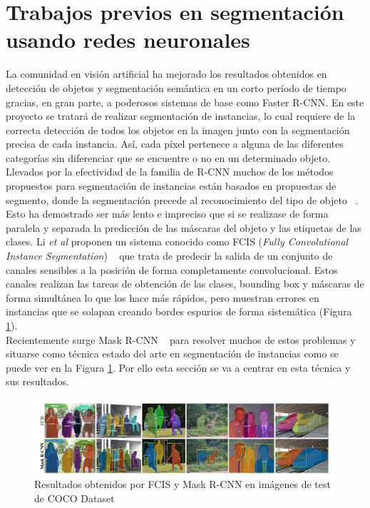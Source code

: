 \documentclass{bmvc2k}
\def\etal{\emph{et al}\bmvaOneDot}
\begin{document}
\section{Trabajos previos en segmentación usando redes neuronales}
La comunidad en visión artificial ha mejorado los resultados obtenidos en detección de objetos y segmentación semántica en un corto período de tiempo gracias, en gran parte, a poderosos sistemas de base como Faster R-CNN. En este proyecto se tratará de realizar segmentación de instancias, lo cual requiere de la correcta detección de todos los objetos en la imagen junto con la segmentación precisa de cada instancia. Así, cada píxel pertenece a alguna de las diferentes categorías sin diferenciar que se encuentre o no en un determinado objeto.\\
Llevados por la efectividad de la familia de R-CNN muchos de los métodos propuestos para segmentación de instancias están basados en propuestas de segmento, donde la segmentación precede al reconocimiento del tipo de objeto ~\cite{pinheiro2015learning}. Esto ha demostrado ser más lento e impreciso que si se realizase de forma paralela y separada la predicción de las máscaras del objeto y las etiquetas de las clases. Li \etal{} proponen un sistema conocido como FCIS (\textit{Fully Convolutional Instance Segmentation}) ~\cite{li2016fully} que trata de predecir la salida de un conjunto de canales sensibles a la posición de forma completamente convolucional. Estos canales realizan las tareas de obtención de las clases, bounding box y máscaras de forma simultánea lo que los hace más rápidos, pero muestran errores en instancias que se solapan creando bordes espurios de forma sistemática (Figura \ref{fig:fcis_mask}).\\
Recientemente surge Mask R-CNN ~\cite{he2017mask} para resolver muchos de estos problemas y situarse como técnica estado del arte en segmentación de instancias como se puede ver en la Figura \ref{fig:fcis_mask}. Por ello esta sección se va a centrar en esta técnica y sus resultados.\\
\begin{figure}[H]
\begin{center}
\includegraphics[scale=0.30]{fcis_vs_maskrcnn.png}
\caption{Resultados obtenidos por FCIS y Mask R-CNN en imágenes de test de COCO Dataset}
\label{fig:fcis_mask}
\end{center}
\end{figure}
\end{document}
